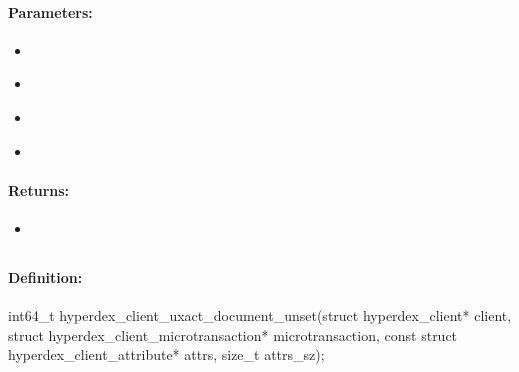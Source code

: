 \paragraph{Parameters:}
\begin{itemize}[noitemsep]
\item {}\\

\item {}\\

\item {}\\

\item {}\\

\end{itemize}

\paragraph{Returns:}
\begin{itemize}[noitemsep]
\item {}\\

\end{itemize}

\pagebreak
\subsection{}
\label{api:c:uxact_document_unset}


\paragraph{Definition:}
\begin{ccode}
int64_t hyperdex_client_uxact_document_unset(struct hyperdex_client* client,
        struct hyperdex_client_microtransaction* microtransaction,
        const struct hyperdex_client_attribute* attrs, size_t attrs_sz);
\end{ccode}

